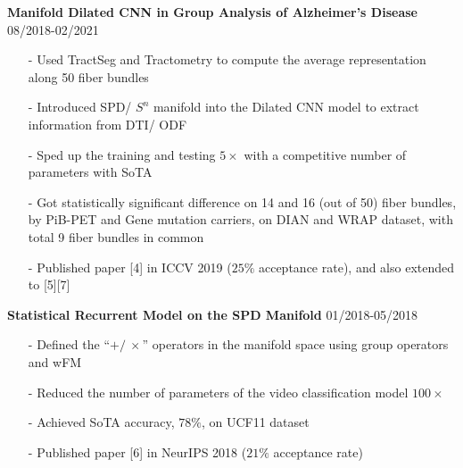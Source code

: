 \documentclass[margin]{res}
\begin{document}
\begin{resume}
                 \vspace{-1em}  


                \textbf{Manifold Dilated CNN in Group Analysis of Alzheimer's Disease} \hfill 08/2018-02/2021
                \begin{itemize}\itemsep -2.2pt %
                 \item[-] Used TractSeg and Tractometry to compute the average representation along 50 fiber bundles
                 \item[-] Introduced SPD/ $S^n$ manifold into the Dilated CNN model to extract information from DTI/ ODF
                 \item[-] Sped up the training and testing $5\times$ with a competitive number of parameters with SoTA
                 \item[-] Got statistically significant difference on 14 and 16 (out of 50) fiber bundles, by PiB-PET and Gene mutation carriers, on DIAN and WRAP dataset, with total 9 fiber bundles in common
                 \item[-] Published paper [4] in ICCV 2019 ($25\%$ acceptance rate), and also extended to [5][7]
                 \end{itemize}

                 \vspace{-1em}  

                 \textbf{Statistical Recurrent Model on the SPD Manifold} \hfill 01/2018-05/2018
                \begin{itemize}\itemsep -2.2pt %
                 \item[-] Defined the ``$+/\ \times$'' operators in the manifold space using group operators and wFM
                 \item[-] Reduced the number of parameters of the video classification model $100\times$
                 \item[-] Achieved SoTA accuracy, $78\%$, on UCF11 dataset
                 \item[-] Published paper [6] in NeurIPS 2018 ($21\%$ acceptance rate)
                 \end{itemize}


\end{resume}
\end{document}
